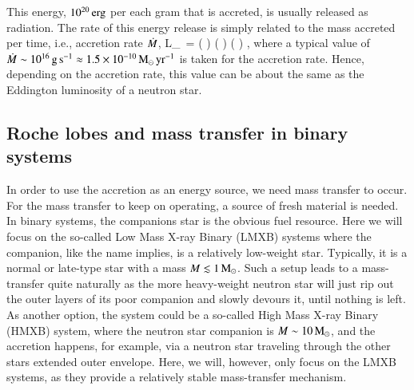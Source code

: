 This energy, $10^{20} \, \mathrm{erg}$ per each gram that is accreted, is usually released as radiation.
The rate of this energy release is simply related to the mass accreted per time, i.e., accretion rate $\dot{M}$, 
\be
L_{} = \Mdot {} \approx {} \left(  \right) \left(  \right) \left(  \right) \ergs,
\ee
where a typical value of $\dot{M} \sim 10^{16} \, \mathrm{g}\,\mathrm{s}^{-1} \approx 1.5 \times 10^{-10} \, \mathrm{M}_{\odot}\,\mathrm{yr}^{-1}$ is taken for the accretion rate.
Hence, depending on the accretion rate, this value can be about the same as the Eddington luminosity  of a neutron star.



\subsection{Roche lobes and mass transfer in binary systems}


In order to use the accretion as an energy source, we need mass transfer to occur.
For the mass transfer to keep on operating, a source of fresh material is needed.
In binary systems, the companions star is the obvious fuel resource.
Here we will focus on the so-called Low Mass X-ray Binary (LMXB) systems where the companion, like the name implies, is a relatively low-weight star.\cite{TH06}
Typically, it is a normal or late-type star with a mass $M \lesssim 1 \, \mathrm{M}_{\odot}$.
Such a setup leads to a mass-transfer quite naturally as the more heavy-weight neutron star will just rip out the outer layers of its poor companion and slowly devours it, until nothing is left.
As another option, the system could be a so-called High Mass X-ray Binary (HMXB) system, where the neutron star companion is $M \sim 10\, \mathrm{M}_{\odot}$, and the accretion happens, for example, via a neutron star traveling through the other stars extended outer envelope.
Here, we will, however, only focus on the LMXB systems, as they provide a relatively stable mass-transfer mechanism.


